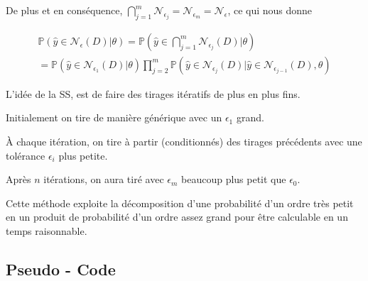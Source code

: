 \documentclass[french,12pt]{article}
\let\oldsubsection\subsection%
\renewcommand{\subsection}{%
  \renewcommand{\theequation}{\thesubsection.\arabic{equation}}%
  \oldsubsection}%
\begin{document}
De plus et en conséquence, $\bigcap_{j = 1}^m \mathcal{N}_{\epsilon_j} = \mathcal{N}_{\epsilon_m} = \mathcal{N}_{\epsilon} $, ce qui nous donne

\begin{align}
    \mathbb{P} \left(\hat{y} \in \mathcal{N}_{\epsilon} (D)| \theta \right) = \mathbb{P} \left(\hat{y} \in \bigcap_{j = 1}^m \mathcal{N}_{\epsilon_j} (D)| \theta\right) \\
    = \mathbb{P} \left(\hat{y} \in \mathcal{N}_{\epsilon_1} (D)| \theta\right)
    \prod_{j = 2}^{m} \mathbb{P} \left(\hat{y} \in \mathcal{N}_{\epsilon_j} (D)|\hat{y} \in \mathcal{N}_{\epsilon_{j - 1}} (D), \theta\right)
\end{align}


L'idée de la SS, est de faire des tirages itératifs de plus en plus fins.

Initialement on tire de manière générique avec un $\epsilon_1$ grand.

À chaque itération, on tire à partir (conditionnés) des tirages précédents avec une tolérance $\epsilon_i$ plus petite.

Après $n$ itérations, on aura tiré avec $\epsilon_m$ beaucoup plus petit que $\epsilon_0$.

Cette méthode exploite la décomposition d'une probabilité d'un ordre très petit
en un produit de probabilité d'un ordre assez grand pour être calculable en un temps raisonnable.



\subsection{Pseudo - Code}

\end{document}
